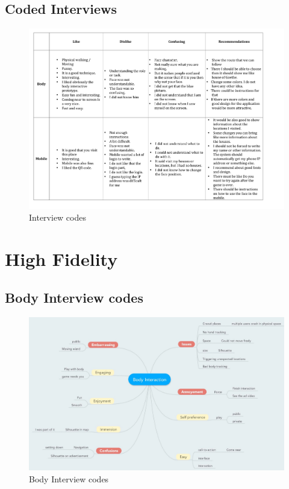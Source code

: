 \begin{appendices}
\section{Coded Interviews}
\begin{figure}[H]
 \centering 
    \includegraphics[width=\textwidth]{Appendices/5/Coded_Interview.pdf}
    \caption{Interview codes}
     \label{app:coded_interview}%
\end{figure}


\newpage
\chapter{High Fidelity}

\setcounter{figure}{0}
\setcounter{table}{0}

\section{Body Interview codes}
\begin{minipage}{1.14\textwidth}
\begin{flushleft} 
\begin{figure}[H]
 \centering 
    \includegraphics[width = \textwidth, height=0.8\textheight]{Appendices/6/Body_Interaction.pdf}
    \caption{Body Interview codes}
     \label{app:bodyinterviewcodes_}%
\end{figure}
\end{flushleft} 
\end{minipage}



\end{appendices}
